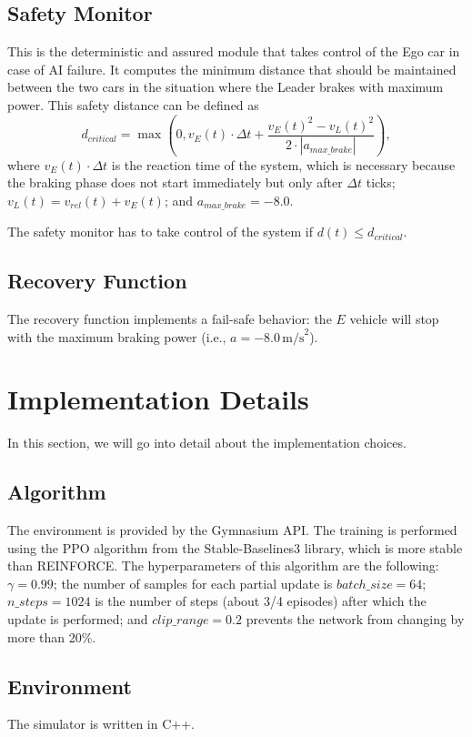 \subsection{Safety Monitor}
This is the deterministic and assured module that takes control of the Ego car in case of AI failure. It computes the minimum distance that should be maintained between the two cars in the situation where the Leader brakes with maximum power. This safety distance can be defined as
\begin{equation}
    d_{critical} = \max\left(0, v_E(t) \cdot \Delta t + \frac{v_E(t)^2 - v_L(t)^2}{2\cdot |a_{max\_brake}|}\right),
\end{equation}
where $v_E(t)\cdot \Delta t$ is the reaction time of the system, which is necessary because the braking phase does not start immediately but only after $\Delta t$ ticks; $v_L(t)=v_{rel}(t)+v_E(t)$; and $a_{max\_brake}=-8.0$.

The safety monitor has to take control of the system if $d(t)\le d_{critical}$.

\subsection{Recovery Function}
The recovery function implements a fail-safe behavior: the $E$ vehicle will stop with the maximum braking power (i.e., $a=-8.0\,\text{m/s}^2$).

\section{Implementation Details}
In this section, we will go into detail about the implementation choices.

\subsection{Algorithm}
The environment is provided by the Gymnasium API. The training is performed using the PPO algorithm from the Stable-Baselines3 library, which is more stable than REINFORCE. The hyperparameters of this algorithm are the following: $\gamma=0.99$; the number of samples for each partial update is $batch\_size=64$; $n\_steps=1024$ is the number of steps (about 3/4 episodes) after which the update is performed; and $clip\_range=0.2$ prevents the network from changing by more than 20\%.

\subsection{Environment}
The simulator is written in C++.

